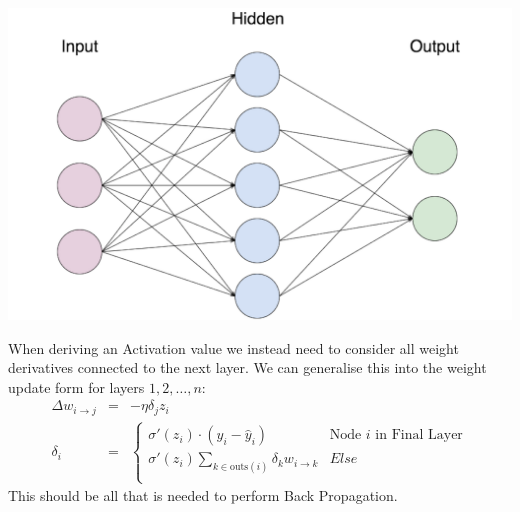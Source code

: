\begin{flushleft}
                    \centerline{\includegraphics[width=14cm]{Images/InitialResearch/NeuralNetworkExample.png}}

                    When deriving an Activation value we instead need to consider all weight derivatives connected to the next layer. 
                    We can generalise this into the weight update form for layers $1,2, \hdots, n$:
                    \begin{eqnarray*}
                        \Delta w_{i \to j} &=& -\eta\delta_j z_i \\
                        \delta_i &=& 
                        \begin{cases}
                            \sigma'(z_i) \cdot (y_i - \hat{y}_i) & \text{Node $i$ in Final Layer} \\
                            \sigma'(z_i) \sum_{k\in\text{outs}(i)}  \delta_k w_{i \to k} & Else \\
                        \end{cases}
                    \end{eqnarray*}
                    This should be all that is needed to perform Back Propagation.
\end{flushleft}